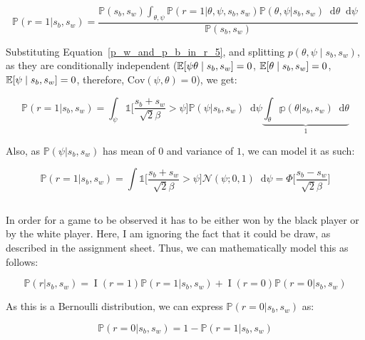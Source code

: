 \documentclass[a4paper,11pt]{article}
\theoremstyle{mytheor}
\newcommand{\E}{\Bbb{E}}
\newcommand{\Cov}{\mathrm{Cov}}
\newcommand*\diff{\mathop{}\!\mathrm{d}}
\begin{document}
\begin{equation}
    \mathbb{P}(r=1|s_b,s_w) = \frac{\mathbb{P}(s_b,s_w)\int_{\theta,\psi} \mathbb{P}(r=1|\theta,\psi,s_b,s_w)\mathbb{P}(\theta,\psi|s_b,s_w)\diff{\theta}\diff{\psi}}{\mathbb{P}(s_b,s_w)}
\end{equation}

Substituting Equation~\ref{p_w_and_p_b_in_r_5}, and splitting $p(\theta,\psi \mid s_b,s_w)$, as they are conditionally independent ($\E[\psi\theta \mid s_b,s_w]=0$, $\E[\theta \mid s_b,s_w]=0$, $\E[\psi \mid s_b,s_w]=0$, therefore, $\Cov(\psi,\theta)=0$), we get:

\begin{equation}
    \mathbb{P}(r=1|s_b,s_w) = \int_{\psi} \mathbb{1}\Big[\frac{s_b+s_w}{\sqrt{2}\beta}>\psi\Big]\mathbb{P}(\psi|s_b,s_w)\diff{\psi}\underbrace{\int_{\theta}\mathbb{p}(\theta|s_b,s_w)\diff{\theta}}_\text{1}
\end{equation}

Also, as $\mathbb{P}(\psi|s_b,s_w)$ has mean of $0$ and variance of $1$, we can model it as such:

\begin{equation}
    \label{eq:r_one_cdf}
    \mathbb{P}(r=1|s_b,s_w) = \int \mathbb{1}\Big[\frac{s_b+s_w}{\sqrt{2}\beta}>\psi\Big]\mathcal{N}( \psi ; 0,1 )\diff{\psi} = \Phi\Big[ \frac{s_b-s_w}{\sqrt{2}\beta} \Big]
\end{equation}

\subsection{}
In order for a game to be observed it has to be either won by the black player or by the white player. Here, I am ignoring the fact that it could be draw, as described in the assignment sheet. Thus, we can mathematically model this as follows:

\begin{equation}
    \label{eq:r_sum}
    \mathbb{P}(r|s_b,s_w) = \mathop{I}(r=1)\mathbb{P}(r=1|s_b,s_w) + \mathop{I}(r=0)\mathbb{P}(r=0|s_b,s_w)
\end{equation}

As this is a Bernoulli distribution, we can express $\mathbb{P}(r=0|s_b,s_w)$ as:

\begin{equation}
    \label{eq:r_zero_expression}
    \mathbb{P}(r=0|s_b,s_w) = 1 - \mathbb{P}(r=1|s_b,s_w)
\end{equation}
\end{document}
